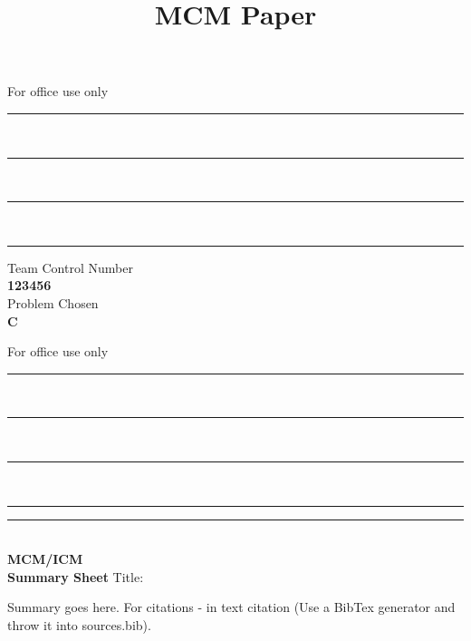 \documentclass[12pt]{article}
\title{MCM Paper}
\newcommand{\teamNumber}{123456}
\newcommand{\problemChosen}{C}
\begin{document}
\begin{titlepage}

\begin{center}
\begingroup
\setlength{\parindent}{0pt}
\begin{minipage}{0.275\linewidth}
    For office use only\\[4pt]
    \rule[-2pt]{0.65\linewidth}{0.5pt}\\[2.5pt]
    \rule[-2pt]{0.65\linewidth}{0.5pt}\\[2.5pt]
    \rule[-2pt]{0.65\linewidth}{0.5pt}\\[2.5pt]
    \rule[-2pt]{0.65\linewidth}{0.5pt}
\end{minipage}%
\begin{minipage}{0.45\linewidth}
    \centering
    Team Control Number\\[0.7pc]
    {\LARGE\textbf{\teamNumber}}\\[1.25pc]
    Problem Chosen\\[0.7pc]
    {\Huge\textbf{\problemChosen}}
\end{minipage}%
\begin{minipage}{0.275\linewidth}
    For office use only\\[4pt]
    \rule[-2pt]{0.65\linewidth}{0.5pt}\\[2.5pt]
    \rule[-2pt]{0.65\linewidth}{0.5pt}\\[2.5pt]
    \rule[-2pt]{0.65\linewidth}{0.5pt}\\[2.5pt]
    \rule[-2pt]{0.65\linewidth}{0.5pt}
\end{minipage}\par
    \vskip 8pt
    \rule{\linewidth}{0.5pt}\par
\textbf{{\large\the\year}\\MCM/ICM\\Summary Sheet}
\endgroup
\vskip 8pt%
\normalfont \LARGE  Title:\par
\end{center}

\begin{addmargin}[.5in]{.5in}
Summary goes here. 
For citations \cite{testing} - in text citation (Use a BibTex generator and throw it into sources.bib). 

\end{addmargin}
\restoregeometry

\end{titlepage}
\end{document}
